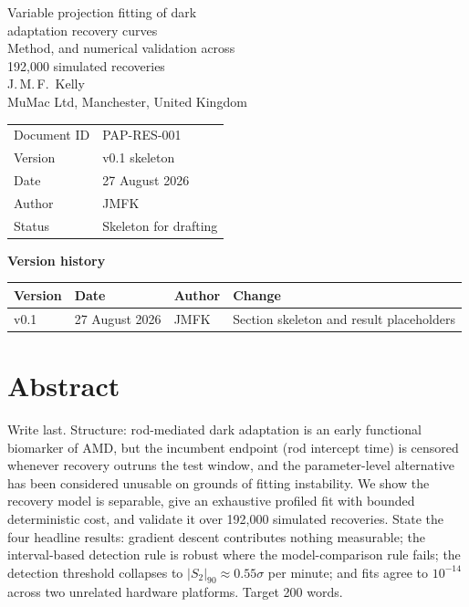 \documentclass[11pt,a4paper]{article}
\newcommand{\docid}{PAP-RES-001}
\newcommand{\docversion}{v0.1 skeleton}
\newcommand{\docdate}{27 August 2026}
\newcommand{\Sii}{S_2}
\begin{document}
\begin{center}
{\LARGE Variable projection fitting of dark\\adaptation recovery curves}\\[3mm]
{\large Method, and numerical validation across\\192,000 simulated recoveries}\\[6mm]
J.\,M.\,F.~Kelly\\
\small MuMac Ltd, Manchester, United Kingdom\\[6mm]
\begin{tabular}{ll}
\toprule
Document ID & \docid \\
Version & \docversion \\
Date & \docdate \\
Author & JMFK \\
Status & Skeleton for drafting \\
\bottomrule
\end{tabular}
\end{center}

\vspace{3mm}
\noindent\textbf{Version history}

\noindent\begin{tabular}{llll}
\toprule
Version & Date & Author & Change \\
\midrule
v0.1 & \docdate & JMFK & Section skeleton and result placeholders \\
\bottomrule
\end{tabular}

\vspace{6mm}

\section*{Abstract}
\begin{towrite}
Write last. Structure: rod-mediated dark adaptation is an early functional
biomarker of AMD, but the incumbent endpoint (rod intercept time) is
censored whenever recovery outruns the test window, and the parameter-level
alternative has been considered unusable on grounds of fitting instability.
We show the recovery model is separable, give an exhaustive profiled fit
with bounded deterministic cost, and validate it over 192,000 simulated
recoveries. State the four headline results: gradient descent contributes
nothing measurable; the interval-based detection rule is robust where the
model-comparison rule fails; the detection threshold collapses to
$|\Sii|_{90} \approx 0.55\sigma$ per minute; and fits agree to $10^{-14}$
across two unrelated hardware platforms. Target 200 words.
\end{towrite}
\end{document}
